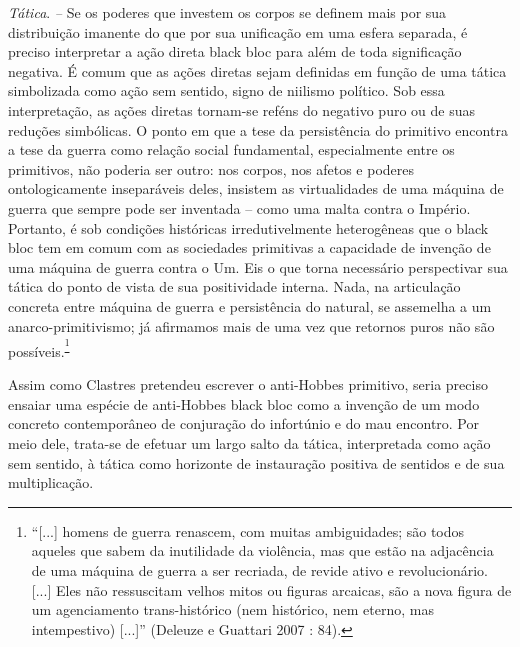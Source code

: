 \emph{ }

\emph{Tática}.\emph{ -- }Se os poderes que investem os corpos se definem
mais por sua distribuição imanente do que por sua unificação em uma
esfera separada, é preciso interpretar a ação direta black bloc para
além de toda significação negativa. É comum que as ações diretas sejam
definidas em função de uma tática simbolizada como ação sem sentido,
signo de niilismo político. Sob essa interpretação, as ações diretas
tornam-se reféns do negativo puro ou de suas reduções simbólicas. O
ponto em que a tese da persistência do primitivo encontra a tese da
guerra como relação social fundamental, especialmente entre os
primitivos, não poderia ser outro: nos corpos, nos afetos e poderes
ontologicamente inseparáveis deles, insistem as virtualidades de uma
máquina de guerra que sempre pode ser inventada -- como uma malta contra
o Império. Portanto, é sob condições históricas irredutivelmente
heterogêneas que o black bloc tem em comum com as sociedades primitivas
a capacidade de invenção de uma máquina de guerra contra o Um. Eis o que
torna necessário perspectivar sua tática do ponto de vista de sua
positividade interna. Nada, na articulação concreta entre máquina de
guerra e persistência do natural, se assemelha a um anarco-primitivismo;
já afirmamos mais de uma vez que retornos puros não são
possíveis.\textsuperscript{\footnote{``{[}...{]} homens de guerra
  renascem, com muitas ambiguidades; são todos aqueles que sabem da
  inutilidade da violência, mas que estão na adjacência de uma máquina
  de guerra a ser recriada, de revide ativo e revolucionário. {[}...{]}
  Eles não ressuscitam velhos mitos ou figuras arcaicas, são a nova
  figura de um agenciamento trans-histórico (nem histórico, nem eterno,
  mas intempestivo) {[}...{]}'' (Deleuze e Guattari 2007 : 84).}}

Assim como Clastres pretendeu escrever o anti-Hobbes primitivo, seria
preciso ensaiar uma espécie de anti-Hobbes black bloc como a invenção de
um modo concreto contemporâneo de conjuração do infortúnio e do mau
encontro. Por meio dele, trata-se de efetuar um largo salto da tática,
interpretada como ação sem sentido, à tática como horizonte de
instauração positiva de sentidos e de sua multiplicação.

